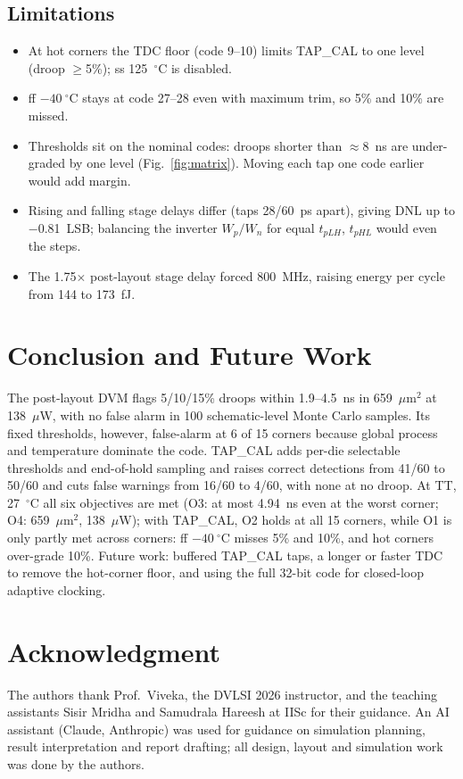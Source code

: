 \documentclass[conference]{IEEEtran}
\begin{document}
\subsection{Limitations}
\begin{itemize}
\item At hot corners the TDC floor (code 9--10) limits TAP\_CAL to one level (droop $\ge$5\%); ss 125~$^\circ$C is disabled.
\item ff $-40~^\circ$C stays at code 27--28 even with maximum trim, so 5\% and 10\% are missed.
\item Thresholds sit on the nominal codes: droops shorter than $\approx$8~ns are under-graded by one level (Fig.~\ref{fig:matrix}). Moving each tap one code earlier would add margin.
\item Rising and falling stage delays differ (taps 28/60~ps apart), giving DNL up to $-$0.81~LSB; balancing the inverter $W_p/W_n$ for equal $t_{pLH}$, $t_{pHL}$ would even the steps.
\item The 1.75$\times$ post-layout stage delay forced 800~MHz, raising energy per cycle from 144 to 173~fJ.
\end{itemize}

\section{Conclusion and Future Work}\label{sec:concl}
The post-layout DVM flags 5/10/15\% droops within 1.9--4.5~ns in 659~$\mu$m$^2$ at 138~$\mu$W, with no false alarm in 100 schematic-level Monte Carlo samples. Its fixed thresholds, however, false-alarm at 6 of 15 corners because global process and temperature dominate the code. TAP\_CAL adds per-die selectable thresholds and end-of-hold sampling and raises correct detections from 41/60 to 50/60 and cuts false warnings from 16/60 to 4/60, with none at no droop. At TT, 27~$^\circ$C all six objectives are met (O3: at most 4.94~ns even at the worst corner; O4: 659~$\mu$m$^2$, 138~$\mu$W); with TAP\_CAL, O2 holds at all 15 corners, while O1 is only partly met across corners: ff $-40~^\circ$C misses 5\% and 10\%, and hot corners over-grade 10\%. Future work: buffered TAP\_CAL taps, a longer or faster TDC to remove the hot-corner floor, and using the full 32-bit code for closed-loop adaptive clocking.

\section*{Acknowledgment}
The authors thank Prof.~Viveka, the DVLSI 2026 instructor, and the teaching assistants Sisir Mridha and Samudrala Hareesh at IISc for their guidance. An AI assistant (Claude, Anthropic) was used for guidance on simulation planning, result interpretation and report drafting; all design, layout and simulation work was done by the authors.
\end{document}
